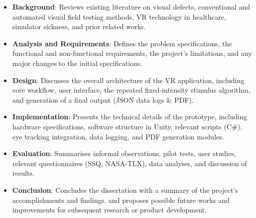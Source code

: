\documentclass{l4proj}
\begin{document}
\begin{itemize}
   

    \item \textbf{Background}: Reviews existing literature on visual defects, conventional and automated visual field testing methods, VR technology in healthcare, simulator sickness, and prior related works. \newline
    
    \item \textbf{Analysis and Requirements}: Defines the problem specifications, the functional and non-functional requirements, the project’s limitations, and any major changes to the initial specifications. \newline

    \item \textbf{Design}: Discusses the overall architecture of the VR application, including core workflow, user interface, the repeated fixed-intensity stimulus algorithm, and generation of a final output (JSON data logs \& PDF). \newline

    \item \textbf{Implementation}: Presents the technical details of the prototype, including hardware specifications, software structure in Unity, relevant scripts (C\#), eye tracking integration, data logging, and PDF generation modules. \newline

    \item \textbf{Evaluation}: Summarises informal observations, pilot tests, user studies, relevant questionnaires (SSQ, NASA-TLX), data analyses, and discussion of results. \newline

    \item \textbf{Conclusion}: Concludes the dissertation with a summary of the project’s accomplishments and findings, and proposes possible future works and improvements for subsequent research or product development. \newline

\end{itemize}


 
\end{document}
